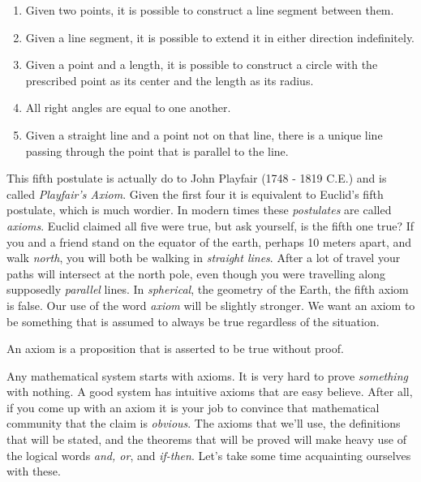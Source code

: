             \begin{enumerate}
                \item Given two points, it is possible to construct a line
                    segment between them.
                \item Given a line segment, it is possible to extend it in
                    either direction indefinitely.
                \item Given a point and a length, it is possible to construct a
                    circle with the prescribed point as its center and the
                    length as its radius.
                \item All right angles are equal to one another.
                \item Given a straight line and a point not on that line,
                    there is a unique line passing through the point that is
                    parallel to the line.
            \end{enumerate}
            This fifth postulate is actually do to John Playfair
            (1748 - 1819 C.E.) and is called \textit{Playfair's Axiom}. Given
            the first four it is equivalent to Euclid's fifth postulate, which
            is much wordier. In modern times these \textit{postulates} are
            called \textit{axioms}. Euclid claimed all five were true, but ask
            yourself, is the fifth one true? If you and a friend stand on the
            equator of the earth, perhaps 10 meters apart, and walk
            \textit{north}, you will both be walking in \textit{straight lines}.
            After a lot of travel your paths will intersect at the north pole,
            even though you were travelling along supposedly \textit{parallel}
            lines. In \textit{spherical}, the geometry of the Earth, the fifth
            axiom is false. Our use of the word \textit{axiom} will be slightly
            stronger. We want an axiom to be something that is assumed to
            always be true regardless of the situation.
            \begin{definition}
                An axiom is a proposition that is asserted to be true
                without proof.
            \end{definition}
            Any mathematical system starts with axioms. It is very hard to prove
            \textit{something} with nothing. A good system has intuitive axioms
            that are easy believe. After all, if you come up with an axiom it
            is your job to convince that mathematical community that the claim
            is \textit{obvious}. The axioms that we'll use, the definitions
            that will be stated, and the theorems that will be proved will make
            heavy use of the logical words \textit{and, or}, and
            \textit{if-then}. Let's take some time acquainting ourselves with
            these.
